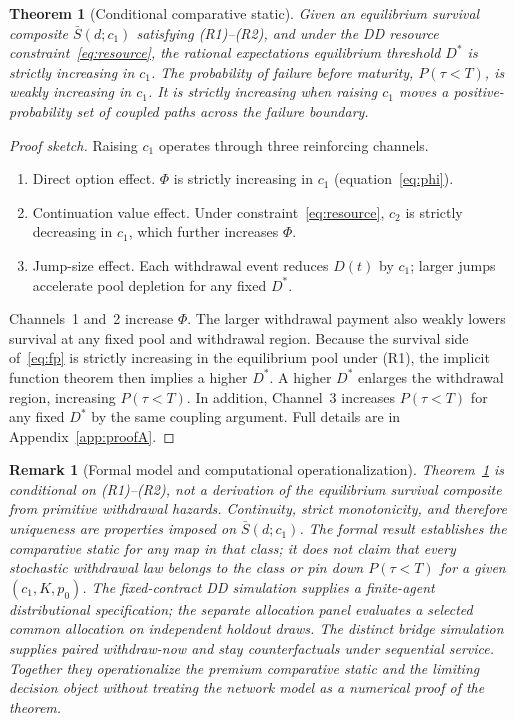 \documentclass[12pt]{article}\usepackage[]{graphicx}\usepackage[]{xcolor}
\newtheorem{theorem}{Theorem}
\newtheorem{remark}{Remark}
\begin{document}
\begin{theorem}[Conditional comparative static]
\label{thm:main}
Given an equilibrium survival composite $\bar S(d;c_1)$ satisfying (R1)--(R2), and under the DD resource constraint~\eqref{eq:resource}, the rational expectations equilibrium threshold $D^*$ is strictly increasing in $c_1$.
The probability of failure before maturity, $P(\tau < T)$, is weakly increasing in $c_1$.
It is strictly increasing when raising $c_1$ moves a positive-probability set of coupled paths across the failure boundary.
\end{theorem}
\begin{proof}[Proof sketch]
Raising $c_1$ operates through three reinforcing channels.
\begin{enumerate}
  \item Direct option effect. $\Phi$ is strictly increasing
    in $c_1$ (equation~\eqref{eq:phi}).
  \item Continuation value effect. Under
    constraint~\eqref{eq:resource}, $c_2$ is strictly decreasing in
    $c_1$, which further increases $\Phi$.
  \item Jump-size effect. Each withdrawal event reduces $D(t)$
    by $c_1$; larger jumps accelerate pool depletion for any fixed
    $D^*$.
\end{enumerate}
Channels~1 and~2 increase $\Phi$.
The larger withdrawal payment also weakly lowers survival at any fixed pool and withdrawal region.
Because the survival side of~\eqref{eq:fp} is strictly increasing in the equilibrium pool under (R1), the implicit function theorem then implies a higher $D^*$.
A higher $D^*$ enlarges the withdrawal region, increasing $P(\tau<T)$.
In addition, Channel~3 increases $P(\tau<T)$ for any fixed $D^*$ by the same coupling argument.
Full details are in Appendix~\ref{app:proofA}.
\end{proof}

\begin{remark}[Formal model and computational operationalization]
\label{rem:partial}
Theorem~\ref{thm:main} is conditional on (R1)--(R2), not a derivation of the equilibrium survival composite from primitive withdrawal hazards.
Continuity, strict monotonicity, and therefore uniqueness are properties imposed on $\bar S(d;c_1)$.
The formal result establishes the comparative static for any map in that class; it does not claim that every stochastic withdrawal law belongs to the class or pin down $P(\tau<T)$ for a given $(c_1,K,p_0)$.
The fixed-contract DD simulation supplies a finite-agent distributional specification; the separate allocation panel evaluates a selected common allocation on independent holdout draws.
The distinct bridge simulation supplies paired withdraw-now and stay counterfactuals under sequential service.
Together they operationalize the premium comparative static and the limiting decision object without treating the network model as a numerical proof of the theorem.
\end{remark}
\end{document}
